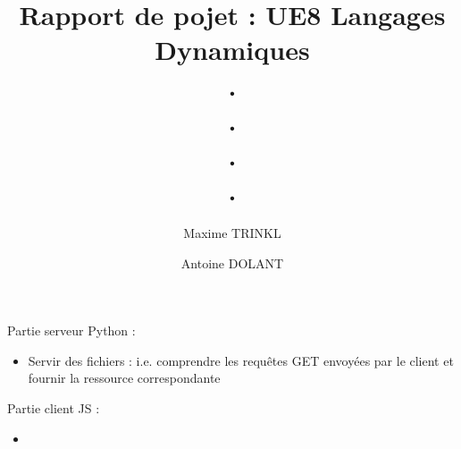 \documentclass[10pt]{report}
\title{\Huge Rapport de pojet : UE8 Langages Dynamiques\\ . \\ . \\ . \\ . }
\author{Maxime TRINKL \and Antoine DOLANT}
\begin{document}
\maketitle
\newpage
Partie serveur Python : 
\begin{itemize}
\item Servir des fichiers : i.e. comprendre les requêtes GET envoyées par le client et fournir la ressource correspondante

\end{itemize}


Partie client JS :
\begin{itemize}
\item 


\end{itemize}
\end{document}
